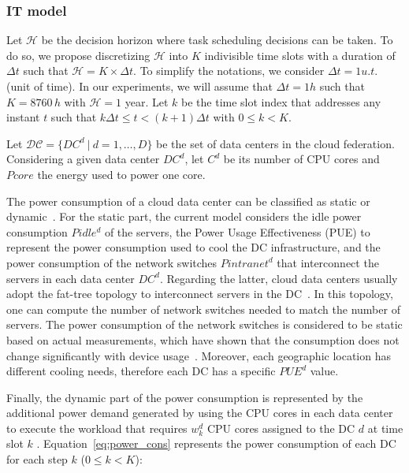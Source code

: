 \subsubsection{IT model} 
\label{sec:it_model_ccgrid}

Let $\mathcal{H}$  be the decision horizon where task scheduling decisions can be taken. To do so, we propose discretizing $\mathcal{H}$ into $K$ indivisible time slots with a duration of $\Delta t$ such that $\mathcal{H} = K\times\Delta t$. To simplify the notations, we consider $\Delta t = 1 u.t.$ (unit of time). In our experiments, we will assume that $\Delta t = 1h$ such that $K = 8760\,h$ with $\mathcal{H} = 1$ year. 
Let $k$ be the time slot index that addresses any instant $t$ such that $k\Delta t\leq t < (k+1)\Delta t$ with $0\leq k< K$. 



Let $\mathcal{DC} = \{DC^d \ | \ d=1, \ldots, D\}$ be the set of data centers in the cloud federation. Considering a given data center $DC^d$, let $C^d$ be its number of CPU cores and $Pcore$ the energy used to power one core.


The power consumption of a cloud data center can be classified as static or dynamic~\cite{ahvar22_estimating_cloud_cons}. For the static part, the current model considers the idle power consumption $Pidle^d$ of the servers, the Power Usage Effectiveness (PUE) to represent the power consumption used to cool the DC infrastructure, and the power consumption of the network switches $Pintranet^d$ that interconnect the servers in each data center $DC^d$. Regarding the latter, cloud data centers usually adopt the fat-tree topology to interconnect servers in the DC~\cite{ahvar22_estimating_cloud_cons}. In this topology, one can compute the number of network switches needed to match the number of servers. The power consumption of the network switches is considered to be static based on actual measurements, which have shown that the consumption does not change significantly with device usage~\cite{Hlavacs2009_energy_network_devices}. Moreover, each geographic location has different cooling needs, therefore each DC has a specific $PUE^d$ value. 


Finally, the dynamic part of the power consumption is represented by the additional power demand generated by using the CPU cores in each data center to execute the workload that requires $ w^d_k$ CPU cores assigned to the DC $d$ at time slot $k$ . Equation~\eqref{eq:power_cons} represents the power consumption of each DC for each step $k$ ($0\leq k<K$):

